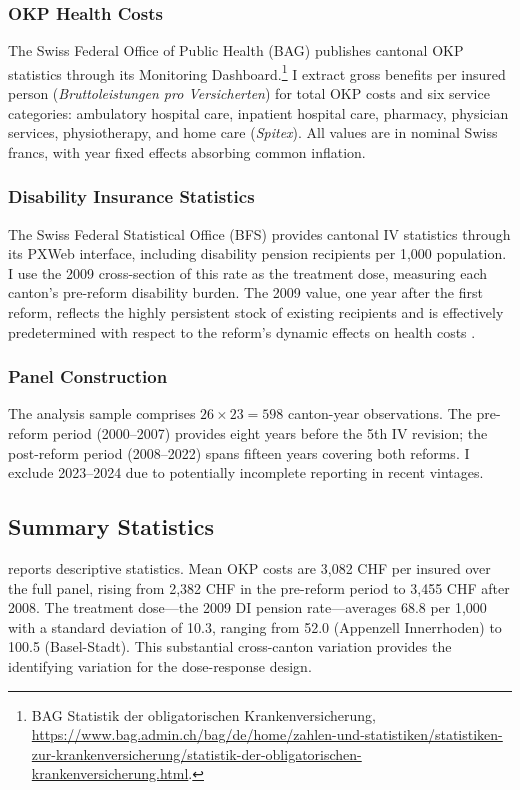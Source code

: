 \documentclass[12pt]{article}
\begin{document}
\subsubsection*{OKP Health Costs} The Swiss Federal Office of Public Health (BAG) publishes cantonal OKP statistics through its Monitoring Dashboard.\footnote{BAG Statistik der obligatorischen Krankenversicherung, \url{https://www.bag.admin.ch/bag/de/home/zahlen-und-statistiken/statistiken-zur-krankenversicherung/statistik-der-obligatorischen-krankenversicherung.html}.} I extract gross benefits per insured person (\textit{Bruttoleistungen pro Versicherten}) for total OKP costs and six service categories: ambulatory hospital care, inpatient hospital care, pharmacy, physician services, physiotherapy, and home care (\textit{Spitex}). All values are in nominal Swiss francs, with year fixed effects absorbing common inflation.

\subsubsection*{Disability Insurance Statistics} The Swiss Federal Statistical Office (BFS) provides cantonal IV statistics through its PXWeb interface, including disability pension recipients per 1,000 population. I use the 2009 cross-section of this rate as the treatment dose, measuring each canton's pre-reform disability burden. The 2009 value, one year after the first reform, reflects the highly persistent stock of existing recipients and is effectively predetermined with respect to the reform's dynamic effects on health costs \citep{gruber2000disability}.

\subsubsection*{Panel Construction} The analysis sample comprises $26 \times 23 = 598$ canton-year observations. The pre-reform period (2000--2007) provides eight years before the 5th IV revision; the post-reform period (2008--2022) spans fifteen years covering both reforms. I exclude 2023--2024 due to potentially incomplete reporting in recent vintages.

\subsection{Summary Statistics}



 reports descriptive statistics. Mean OKP costs are 3,082 CHF per insured over the full panel, rising from 2,382 CHF in the pre-reform period to 3,455 CHF after 2008. The treatment dose---the 2009 DI pension rate---averages 68.8 per 1,000 with a standard deviation of 10.3, ranging from 52.0 (Appenzell Innerrhoden) to 100.5 (Basel-Stadt). This substantial cross-canton variation provides the identifying variation for the dose-response design.
\end{document}
